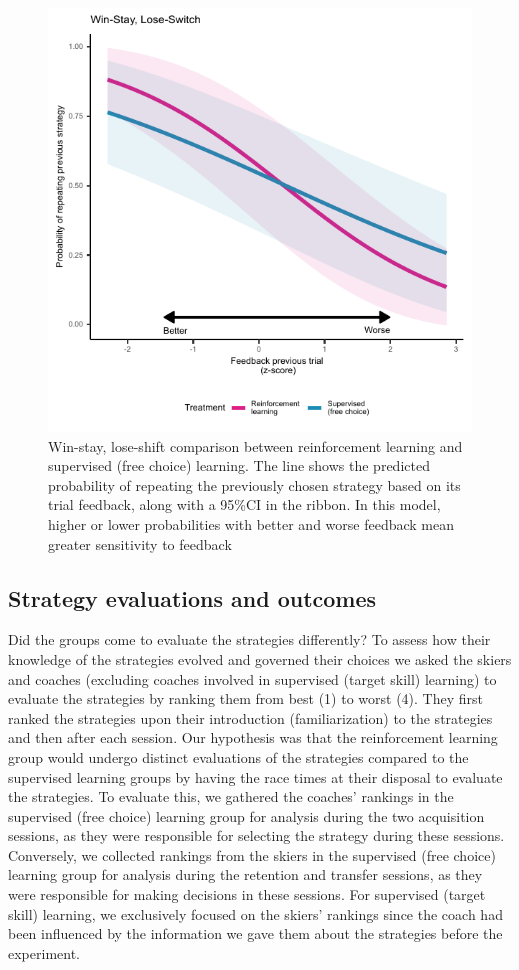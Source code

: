 \documentclass[pdflatex,sn-mathphys-num]{sn-jnl}%
\theoremstyle{thmstyleone}%
\theoremstyle{thmstyletwo}%
\theoremstyle{thmstylethree}%
\begin{document}
\begin{figure}[H]
\centering
\includegraphics{figures/figure_winstaylooseshift.pdf}
\caption{Win-stay, lose-shift comparison between reinforcement learning and supervised (free choice) learning. The line shows the predicted probability of repeating the previously chosen strategy based on its trial feedback, along with a 95\%CI in the ribbon. In this model, higher or lower probabilities with better and worse feedback mean greater sensitivity to feedback}\label{fig: choice_wsls}
\end{figure}


\subsection{Strategy evaluations and outcomes}
Did the groups come to evaluate the strategies differently? To assess how their knowledge of the strategies evolved and governed their choices we asked the skiers and coaches (excluding coaches involved in supervised (target skill) learning) to evaluate the strategies by ranking them from best (1) to worst (4). They first ranked the strategies upon their introduction (familiarization) to the strategies and then after each session. Our hypothesis was that the reinforcement learning group would undergo distinct evaluations of the strategies compared to the supervised learning groups by having the race times at their disposal to evaluate the strategies. To evaluate this, we gathered the coaches' rankings in the supervised (free choice) learning group for analysis during the two acquisition sessions, as they were responsible for selecting the strategy during these sessions. Conversely, we collected rankings from the skiers in the supervised (free choice) learning group for analysis during the retention and transfer sessions, as they were responsible for making decisions in these sessions. For supervised (target skill) learning, we exclusively focused on the skiers' rankings since the coach had been influenced by the information we gave them about the strategies before the experiment. 
\end{document}

